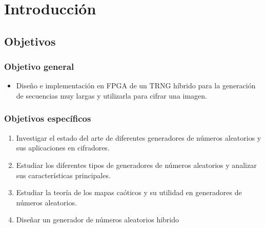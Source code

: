 \chapter{Introducción}
	
	\section{Objetivos}
	
		\subsection{Objetivo general}
			\begin{itemize}
				\item Diseño e implementación en FPGA de un TRNG híbrido para la generación de secuencias muy largas y utilizarla para cifrar una imagen.
			\end{itemize}
		
		\subsection{Objetivos específicos}
			\begin{enumerate}
                \item Investigar el estado del arte de diferentes generadores de números aleatorios y sus aplicaciones en cifradores.
                \item Estudiar los diferentes tipos de generadores de números aleatorios y analizar sus características principales.
                \item Estudiar la teoría de los mapas caóticos y su utilidad en generadores de números aleatorios.
                \item Diseñar un generador de números aleatorios hibrido 
			\end{enumerate}

